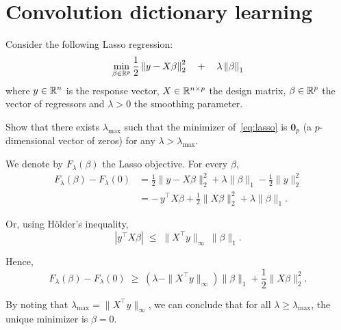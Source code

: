 \documentclass[11pt]{article}
\begin{document}
\section{Convolution dictionary learning}

\begin{exercise}
Consider the following Lasso regression:
\begin{equation}\label{eq:lasso}
    \min_{\beta\in\mathbb{R}^p} \frac{1}{2}\left\lVert y-X\beta\right\rVert^2_2 \quad + \quad \lambda \left\lVert\beta\right\rVert_1
\end{equation}
where $y\in\mathbb{R}^n$ is the response vector, $X\in\mathbb{R}^{n\times p}$ the design matrix, $\beta\in\mathbb{R}^p$ the vector of regressors and $\lambda>0$ the smoothing parameter.

Show that there exists $\lambda_{\max}$ such that the minimizer of~\eqref{eq:lasso} is $\mathbf{0}_p$ (a $p$-dimensional vector of zeros) for any $\lambda > \lambda_{\max}$. 
\end{exercise}

\begin{solution}  %
    We denote by \( F_\lambda(\beta) \) the Lasso objective.  
    For every \( \beta \),
    \begin{equation*}
    \begin{aligned}
    F_\lambda(\beta) - F_\lambda(0)
    &= \frac{1}{2}\|y - X\beta\|_2^2 + \lambda \|\beta\|_1 - \frac{1}{2}\|y\|_2^2 \\[6pt]
    &= -\,y^\top X\beta + \frac{1}{2}\|X\beta\|_2^2 + \lambda \|\beta\|_1.
    \end{aligned}
    \end{equation*}

    Or, using Hölder's inequality,
    \begin{equation*}
        |y^\top X\beta| \;\leq\; \|X^\top y\|_\infty \, \|\beta\|_1.
    \end{equation*}

    Hence,
    \begin{equation*}
        F_\lambda(\beta) - F_\lambda(0)
        \;\geq\;
        \left( \lambda - \|X^\top y\|_\infty \right) \|\beta\|_1
        + \frac{1}{2}\|X\beta\|_2^2.
    \end{equation*}

By noting that \(\lambda_{\max} = \|X^\top y\|_\infty\), we can conclude that for all \(\lambda \geq \lambda_{\max}\), the unique minimizer is \(\beta = 0\).

\end{solution}
\end{document}
